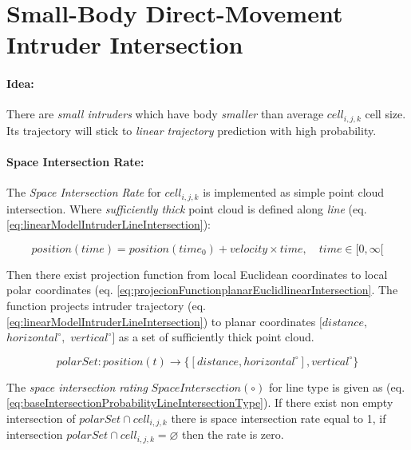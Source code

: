 \section[Small-Body Direct-Movement Intruder Intersection]{Small-Body Direct-Movement \\ Intruder Intersection}\label{s:linearIntersectionModel}
\paragraph{Idea:} There are \emph{small intruders} which have body \emph{smaller} than average $cell_{i,j,k}$ cell size. Its trajectory will stick to \emph{linear trajectory} prediction with high probability. 

\paragraph{Space Intersection Rate:} The \emph{Space Intersection Rate} for $cell_{i,j,k}$ is implemented as simple point cloud intersection. Where \emph{sufficiently thick} point cloud is defined along \emph{line} (eq. \ref{eq:linearModelIntruderLineIntersection}):

\begin{equation}\label{eq:linearModelIntruderLineIntersection}
    position(time) = position(time_0) + velocity \times time,\quad time \in [0,\infty[
\end{equation}

Then there exist projection function from local Euclidean  coordinates to local polar coordinates (eq. \ref{eq:projecionFunctionplanarEuclidlinearIntersection}. The function projects intruder trajectory (eq. \ref{eq:linearModelIntruderLineIntersection}) to planar coordinates $[distance,$ $horizontal^\circ,$ $vertical^\circ]$  as a set of sufficiently thick point cloud.

\begin{equation}\label{eq:projecionFunctionplanarEuclidlinearIntersection}
    polarSet:position(t)\to\{[distance, horizontal^\circ], vertical^\circ\}
\end{equation}


\noindent The \emph{space intersection rating} $SpaceIntersection(\circ)$ for line type is given as (eq. \ref{eq:baseIntersectionProbabilityLineIntersectionType}). If there exist non empty intersection of $polarSet\cap cell_{i,j,k}$ there is space intersection rate equal to  1, if intersection $polarSet\cap cell_{i,j,k} = \varnothing$ then the rate is zero.


